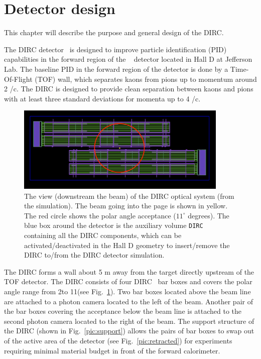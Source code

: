 \section{Detector design}

This chapter will describe the purpose and general design of the \gluex DIRC.
\vspace{0.5cm}

The \gluex DIRC detector~\cite{dirc} is designed to improve particle identification (PID) capabilities in the forward region of the \gluex~\cite{gluex1, gluex2} detector located in Hall D at Jefferson Lab. The baseline PID in the forward region of the \gluex detector is done by a Time-Of-Flight (TOF) wall, which separates kaons from pions up to momentum around 2 \gev/c. The \gluex DIRC is designed to provide clean separation between kaons and pions with at least three standard deviations for momenta up to 4 \gev/c.

\begin{figure}[!htb]
\centering
\includegraphics[width=0.9\textwidth]{pics/sim1.png}
\caption{\label{pic:sim}
The view (downstream the beam) of the \gluex DIRC optical system (from the simulation). The beam going into the page is shown in yellow. The red circle shows the polar angle acceptance ($11^{\circ}$ degrees).
The blue box around the detector is the auxiliary volume \texttt{DIRC} containing all the DIRC components, which can be activated/deactivated in the Hall D geometry to insert/remove the \gluex DIRC to/from the \gluex DIRC detector simulation.}
\end{figure}

The \gluex DIRC forms a wall about 5 m away from the target directly upstream of the TOF detector. The DIRC consists of four \babar DIRC~\cite{bdirc1} bar boxes and covers the polar angle range from 2\mydeg to 11\mydeg (see Fig.~\ref{pic:sim}). Two bar boxes located above the beam line are attached to a photon camera located to the left of the beam. Another pair of the bar boxes covering the acceptance below the beam line is attached to the second photon camera located to the right of the beam. The support structure of the DIRC (shown in Fig.~\ref{pic:support}) allows the pairs of bar boxes to swap out of the active area of the detector (see Fig.~\ref{pic:retracted}) for experiments requiring minimal material budget in front of the forward calorimeter.


